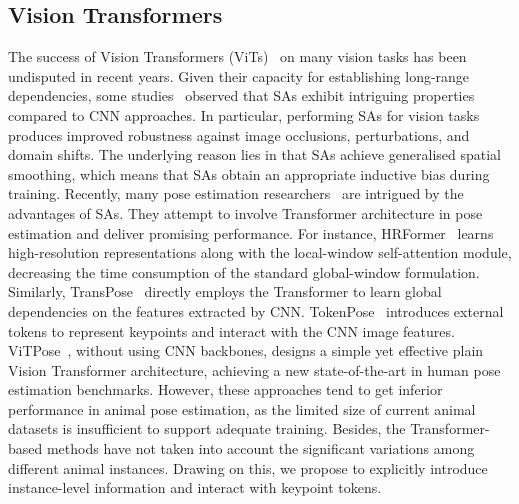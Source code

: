 \subsection{Vision Transformers}
\label{subec:vit}
The success of Vision Transformers (ViTs)~\cite{dosovitskiy2020image,liu2021swin} on many vision tasks has been undisputed in recent years.
Given their capacity for establishing long-range dependencies, some studies~\cite{park2022how,naseer2021intriguing,mao2022towards} observed that SAs exhibit intriguing properties compared to CNN approaches.
In particular, performing SAs for vision tasks produces improved robustness against image occlusions, perturbations, and domain shifts.
The underlying reason lies in that SAs achieve generalised spatial smoothing, which means that SAs obtain an appropriate inductive bias during training.
Recently, many pose estimation researchers~\cite{yang2021transpose,li2021tokenpose,yuan2021hrformer,xu2022vitpose,li2021prtr} are intrigued by the advantages of SAs.
They attempt to involve Transformer architecture in pose estimation and deliver promising performance.
For instance, HRFormer~\cite{yuan2021hrformer} learns high-resolution representations along with the local-window self-attention module, decreasing the time consumption of the standard global-window formulation.
Similarly, TransPose~\cite{yang2021transpose} directly employs the Transformer to learn global dependencies on the features extracted by CNN.
TokenPose~\cite{li2021tokenpose} introduces external tokens to represent keypoints and interact with the CNN image features.
ViTPose~\cite{xu2022vitpose}, without using CNN backbones, designs a simple yet effective plain Vision Transformer architecture, achieving a new state-of-the-art in human pose estimation benchmarks.
However, these approaches tend to get inferior performance in animal pose estimation, as the limited size of current animal datasets is insufficient to support adequate training.
Besides, the Transformer-based methods have not taken into account the significant variations among different animal instances.
Drawing on this, we propose to explicitly introduce instance-level information and interact with keypoint tokens.